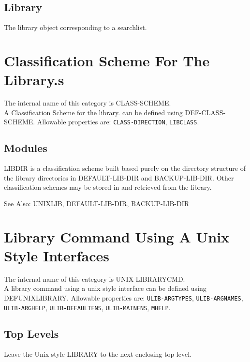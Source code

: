 \section{Library}

\begin{description} 
\item[SLIST]  
The library object corresponding to a searchlist.
\item
\end{description}
\chapter{Classification Scheme For The Library.s}
The internal name of this category is 
CLASS-SCHEME.\\
A Classification Scheme for the library. can be defined using DEF-CLASS-SCHEME.
Allowable properties are: \texttt{CLASS-DIRECTION}, \texttt{LIBCLASS}.

\section{Modules}

\begin{description} 
\item[LIBDIR]  
LIBDIR is a classification scheme built based purely on the
directory structure of the library directories in DEFAULT-LIB-DIR
and BACKUP-LIB-DIR.  Other classification schemes may be stored in
and retrieved from the library.

See Also:  UNIXLIB, DEFAULT-LIB-DIR, BACKUP-LIB-DIR
\item
\end{description}
\chapter{Library Command Using A Unix Style Interfaces}
The internal name of this category is 
UNIX-LIBRARYCMD.\\
A library command using a unix style interface can be defined using DEFUNIXLIBRARY.
Allowable properties are: \texttt{ULIB-ARGTYPES}, \texttt{ULIB-ARGNAMES}, \texttt{ULIB-ARGHELP}, \texttt{ULIB-DEFAULTFNS}, \texttt{ULIB-MAINFNS}, \texttt{MHELP}.

\section{Top Levels}

\begin{description} 
\item[LEAVE]  
Leave the Unix-style LIBRARY to the next enclosing top level.
\item
\end{description}

